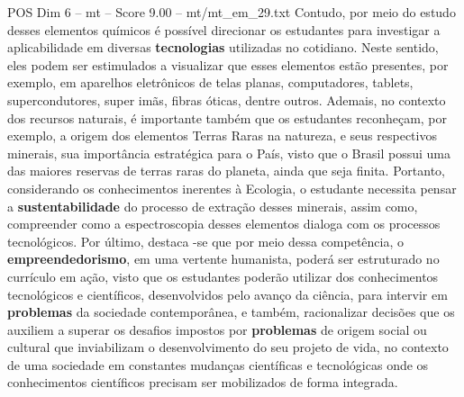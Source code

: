 \begin{textsample}{POS Dim 6 – mt – Score 9.00 – mt/mt\_em\_29.txt}
Contudo, por meio do estudo desses elementos químicos é possível direcionar os estudantes para investigar a aplicabilidade em diversas \textbf{tecnologias} utilizadas no cotidiano.
Neste sentido, eles podem ser estimulados a visualizar que esses elementos estão presentes, por exemplo, em aparelhos eletrônicos de telas planas, computadores, tablets, supercondutores, super imãs, fibras óticas, dentre outros.
Ademais, no contexto dos recursos naturais, é importante também que os estudantes reconheçam, por exemplo, a origem dos elementos Terras Raras na natureza, e seus respectivos minerais, sua importância estratégica para o País, visto que o Brasil possui uma das maiores reservas de terras raras do planeta, ainda que seja finita.
Portanto, considerando os conhecimentos inerentes à Ecologia, o estudante necessita pensar a \textbf{sustentabilidade} do processo de extração desses minerais, assim como, compreender como a espectroscopia desses elementos dialoga com os processos tecnológicos.
Por último, destaca -se que por meio dessa competência, o \textbf{empreendedorismo}, em uma vertente humanista, poderá ser estruturado no currículo em ação, visto que os estudantes poderão utilizar dos conhecimentos tecnológicos e científicos, desenvolvidos pelo avanço da ciência, para intervir em \textbf{problemas} da sociedade contemporânea, e também, racionalizar decisões que os auxiliem a superar os desafios impostos por \textbf{problemas} de origem social ou cultural que inviabilizam o desenvolvimento do seu projeto de vida, no contexto de uma sociedade em constantes mudanças científicas e tecnológicas onde os conhecimentos científicos precisam ser mobilizados de forma integrada.

\end{textsample}
